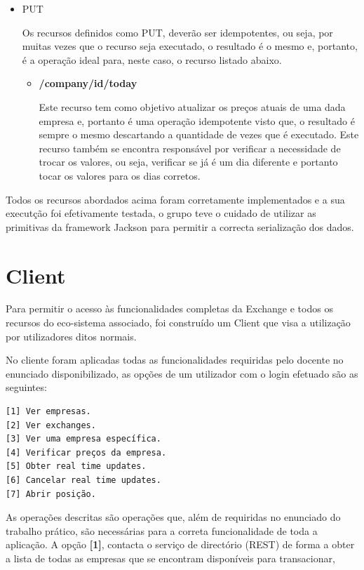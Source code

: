 \documentclass[a4paper,12pt]{article}
\begin{document}
\begin{itemize}
\begin{itemize}
    
  \end{itemize}
\item PUT
  \par Os recursos definidos como PUT, deverão ser idempotentes, ou seja, por muitas vezes que o recurso seja executado, o resultado é o mesmo e, portanto, é a operação ideal para, neste caso, o recurso listado abaixo.
  \begin{itemize}
    \item \textbf{/company/{id}/today}

    \par Este recurso tem como objetivo atualizar os preços atuais de uma dada empresa e, portanto é uma operação idempotente visto que, o resultado é sempre o mesmo descartando a quantidade de vezes que é executado. Este recurso também se encontra responsável por verificar a necessidade de trocar os valores, ou seja, verificar se já é um dia diferente e portanto tocar os valores para os dias corretos.
  \end{itemize}
\end{itemize}

\par Todos os recursos abordados acima foram corretamente implementados e a sua executção foi efetivamente testada, o grupo teve o cuidado de utilizar as primitivas da framework Jackson para permitir a correcta serialização dos dados.

\section{Client}
Para permitir o acesso às funcionalidades completas da Exchange e todos os recursos do eco-sistema associado, foi construído um Client que visa a utilização por utilizadores ditos normais.
\par No cliente foram aplicadas todas as funcionalidades requiridas pelo docente no enunciado disponibilizado, as opções de um utilizador com o login efetuado são as seguintes:
\begin{verbatim}
[1] Ver empresas.
[2] Ver exchanges.
[3] Ver uma empresa específica.
[4] Verificar preços da empresa.
[5] Obter real time updates.
[6] Cancelar real time updates.
[7] Abrir posição.
\end{verbatim}
\par As operações descritas são operações que, além de requiridas no enunciado do trabalho prático, são necessárias para a correta funcionalidade de toda a aplicação. A opção \textbf{[1]}, contacta o serviço de directório (REST) de forma a obter a lista de todas as empresas que se encontram disponíveis para transacionar, 
\end{document}
